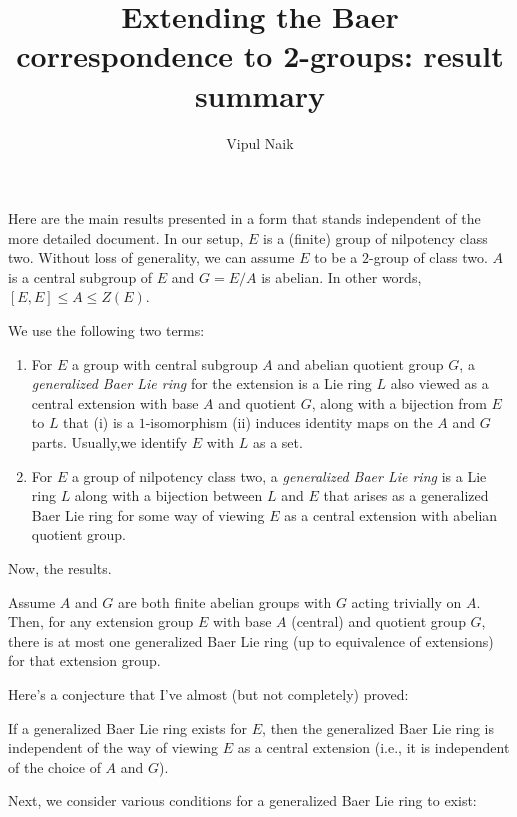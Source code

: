 \documentclass[10pt]{amsart}
\title{Extending the Baer correspondence to 2-groups: result summary}
\author{Vipul Naik}
\begin{document}
\maketitle

Here are the main results presented in a form that stands independent
of the more detailed document. In our setup, $E$ is a (finite) group
of nilpotency class two. Without loss of generality, we can assume $E$
to be a $2$-group of class two. $A$ is a central subgroup of $E$ and
$G = E/A$ is abelian. In other words, $[E,E] \le A \le Z(E)$.

We use the following two terms:

\begin{enumerate}
\item For $E$ a group with central subgroup $A$ and abelian quotient
  group $G$, a {\em generalized Baer Lie ring} for the extension is a
  Lie ring $L$ also viewed as a central extension with base $A$ and
  quotient $G$, along with a bijection from $E$ to $L$ that (i) is a
  $1$-isomorphism (ii) induces identity maps on the $A$ and $G$
  parts. Usually,we identify $E$ with $L$ as a set.
\item For $E$ a group of nilpotency class two, a {\em generalized Baer
  Lie ring} is a Lie ring $L$ along with a bijection between $L$ and
  $E$ that arises as a generalized Baer Lie ring for some way of
  viewing $E$ as a central extension with abelian quotient group.
\end{enumerate}

Now, the results.

\begin{theorem}\label{uniqueness}
  Assume $A$ and $G$ are both finite abelian groups with $G$ acting
  trivially on $A$. Then, for any extension group $E$ with base $A$
  (central) and quotient group $G$, there is at most one generalized
  Baer Lie ring (up to equivalence of extensions) for that extension
  group.
\end{theorem}

Here's a conjecture that I've almost (but not completely) proved:

\begin{conjecture}
  If a generalized Baer Lie ring exists for $E$, then the generalized
  Baer Lie ring is independent of the way of viewing $E$ as a central
  extension (i.e., it is independent of the choice of $A$ and $G$).
\end{conjecture}

Next, we consider various conditions for a generalized Baer Lie ring to exist:
\end{document}
